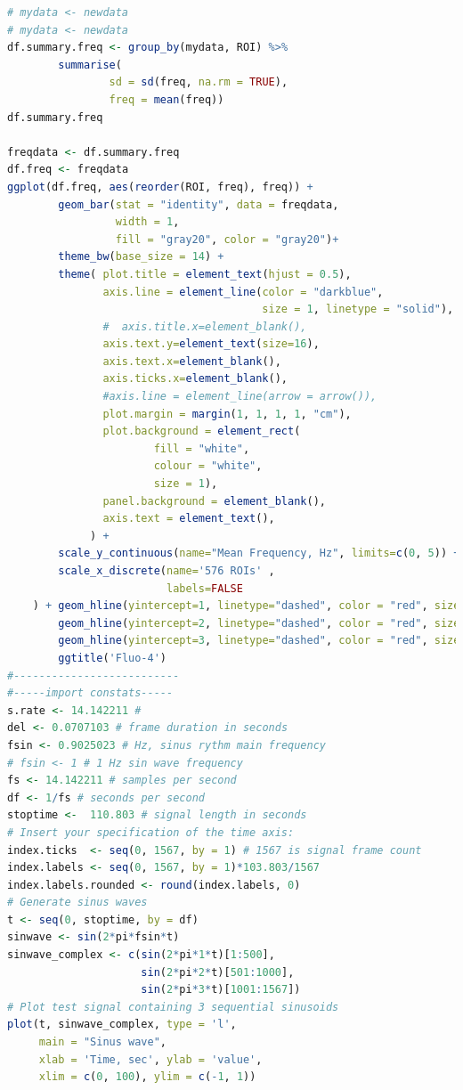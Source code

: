 \documentclass{biophys-new}
\begin{document}
\begin{lstlisting}[language=R]
# mydata <- newdata
# mydata <- newdata
df.summary.freq <- group_by(mydata, ROI) %>%
        summarise(
                sd = sd(freq, na.rm = TRUE),
                freq = mean(freq))
df.summary.freq

freqdata <- df.summary.freq
df.freq <- freqdata
ggplot(df.freq, aes(reorder(ROI, freq), freq)) +
        geom_bar(stat = "identity", data = freqdata,
                 width = 1,
                 fill = "gray20", color = "gray20")+
        theme_bw(base_size = 14) +
        theme( plot.title = element_text(hjust = 0.5),
               axis.line = element_line(color = "darkblue",
                                        size = 1, linetype = "solid"),
               #  axis.title.x=element_blank(),
               axis.text.y=element_text(size=16),
               axis.text.x=element_blank(),
               axis.ticks.x=element_blank(),
               #axis.line = element_line(arrow = arrow()),
               plot.margin = margin(1, 1, 1, 1, "cm"),
               plot.background = element_rect(
                       fill = "white",
                       colour = "white",
                       size = 1),
               panel.background = element_blank(),
               axis.text = element_text(),
             ) +
        scale_y_continuous(name="Mean Frequency, Hz", limits=c(0, 5)) +
        scale_x_discrete(name='576 ROIs' ,
                         labels=FALSE
    ) + geom_hline(yintercept=1, linetype="dashed", color = "red", size = 1) +
        geom_hline(yintercept=2, linetype="dashed", color = "red", size = 1) +
        geom_hline(yintercept=3, linetype="dashed", color = "red", size = 1) +
        ggtitle('Fluo-4')
#--------------------------
#-----import constats-----
s.rate <- 14.142211 #
del <- 0.0707103 # frame duration in seconds
fsin <- 0.9025023 # Hz, sinus rythm main frequency
# fsin <- 1 # 1 Hz sin wave frequency
fs <- 14.142211 # samples per second
df <- 1/fs # seconds per second
stoptime <-  110.803 # signal length in seconds
# Insert your specification of the time axis:
index.ticks  <- seq(0, 1567, by = 1) # 1567 is signal frame count
index.labels <- seq(0, 1567, by = 1)*103.803/1567
index.labels.rounded <- round(index.labels, 0)
# Generate sinus waves
t <- seq(0, stoptime, by = df)
sinwave <- sin(2*pi*fsin*t)
sinwave_complex <- c(sin(2*pi*1*t)[1:500],
                     sin(2*pi*2*t)[501:1000],
                     sin(2*pi*3*t)[1001:1567])
# Plot test signal containing 3 sequential sinusoids
plot(t, sinwave_complex, type = 'l',
     main = "Sinus wave",
     xlab = 'Time, sec', ylab = 'value',
     xlim = c(0, 100), ylim = c(-1, 1))


\end{lstlisting}
\end{document}
